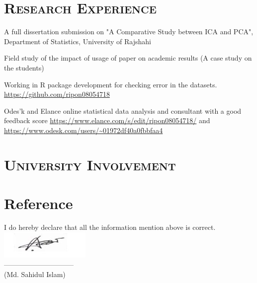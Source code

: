 \documentclass[10pt,a4paper]{moderncv}
\begin{document}
		
		
			
	
	

		\section{\textsc{Research Experience}}

		 {A full dissertation submission on "A Comparative Study between ICA and PCA", Department of Statistics, University of Rajshahi}
		
		 {Field study of the impact of usage of paper on academic results (A case study on the students)}
		
		 {Working in R package development for checking error in the datasets. {\color{see}\url{https://github.com/ripon08054718}}} 
		
		 {Odes'k and Elance online statistical data analysis and consultant with a good feedback score {\color{see}\url{https://www.elance.com/s/edit/ripon08054718/}} and {\color{see}\url{https://www.odesk.com/users/~01972df40a0fbbfaa4}}}
		
		
		\section{\textsc{University Involvement}}
			
		\section{Reference}
		\cvitem{}{ }
		\cvitem{}{ }
		\cvitem{}{ }
		I do hereby declare that all the information mention above is correct.\\		
		\includegraphics[width=0.3\linewidth]{sig}\\
		------------------------------\\
		(Md. Sahidul Islam)
\end{document}
